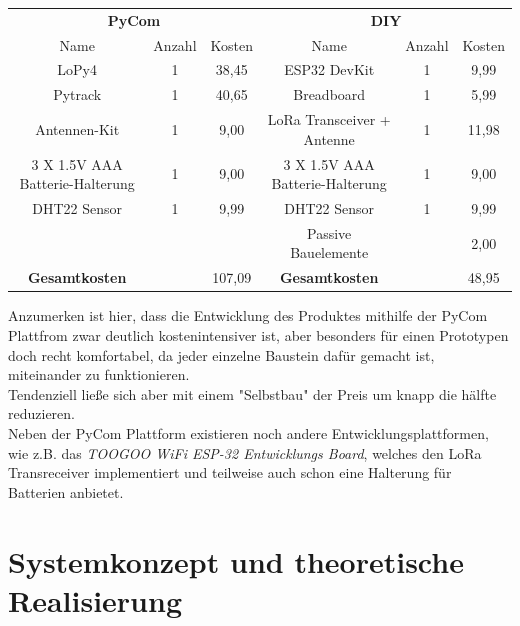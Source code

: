 \begin{adjustwidth}{-1in}{-1in}%
	\begin{center}
	
	        \begin{tabular}{ccc|ccc}
			\toprule
			\multicolumn{3}{c}{\textbf{PyCom}} & \multicolumn{3}{c}{\textbf{DIY}}\\
	
			Name & Anzahl & Kosten & Name & Anzahl & Kosten\\

			\midrule
			LoPy4 & 1 & 38,45 & ESP32 DevKit & 1 & 9,99\\
			Pytrack  & 1 & 40,65 & Breadboard & 1 & 5,99\\
			Antennen-Kit  & 1 & 9,00 & LoRa Transceiver + Antenne & 1 & 11,98\\
			3 X 1.5V AAA Batterie-Halterung & 1 & 9,00 & 3 X 1.5V AAA Batterie-Halterung & 1 & 9,00 \\
			DHT22 Sensor & 1 & 9,99 & DHT22 Sensor & 1 & 9,99\\
			 &  &  & Passive Bauelemente &  & 2,00\\

			\midrule
			\textbf{Gesamtkosten} & & 107,09 & \textbf{Gesamtkosten} & & 48,95\\

			\bottomrule
	
	        \end{tabular}
		\label{}
		 \label{tab:kostenaustellung} 
	\end{center}
\end{adjustwidth}

Anzumerken ist hier, dass die Entwicklung des Produktes mithilfe der PyCom Plattfrom zwar deutlich kostenintensiver ist, aber besonders für einen Prototypen doch recht komfortabel, da jeder einzelne Baustein dafür gemacht ist, miteinander zu funktionieren.\\
Tendenziell ließe sich aber mit einem "Selbstbau" der Preis um knapp die hälfte reduzieren.\\
Neben der PyCom Plattform existieren noch andere Entwicklungsplattformen, wie z.B. das \textit{TOOGOO WiFi ESP-32 Entwicklungs Board}, welches den LoRa Transreceiver implementiert und teilweise auch schon eine Halterung für Batterien anbietet. 


\section{Systemkonzept und theoretische Realisierung} \label{Systemkonzept und theoretische Realisierung}

